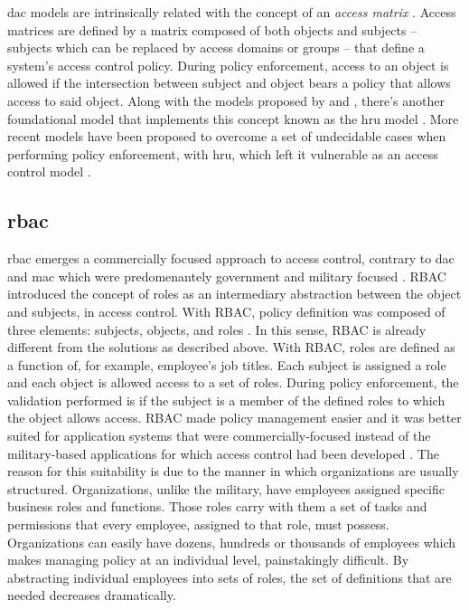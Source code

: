 \gls{dac} models are intrinsically related with the concept of an \emph{access matrix} \cite{graham_protection:_1972, lampson_protection_1974}. Access matrices are defined by a matrix composed of both objects and subjects – subjects which can
be replaced by access domains or groups – that define a system’s access control policy. During policy
enforcement, access to an object is allowed if the intersection between subject and object bears a policy
that allows access to said object. Along with the models proposed by \citeauthor{graham_protection:_1972} and \citeauthor{lampson_protection_1974}, there's another foundational model that implements this concept known as the \gls{hru} model \cite{harrison_protection_1976}. More recent models have been proposed to overcome a set of undecidable cases when performing policy enforcement, with \gls{hru}, which left it vulnerable as an access control model \cite{sandhu_schematic_1988, sandhu_typed_1992}.

\subsection{\glsdesc{rbac}}

\glsdesc{rbac} emerges a commercially focused approach to access control, contrary to \gls{dac} and \gls{mac} which were predomenantely government and military focused \cite{ferraiolo_role-based_1992}. RBAC introduced the concept of roles as an intermediary abstraction between the object and subjects, in access control. With RBAC, policy definition was composed of three elements: subjects, objects, and roles \cite{ferraiolo_role-based_1992}. In this sense, RBAC is already different from the solutions as described above. With RBAC, roles are defined as a function of, for example, employee’s job titles. Each subject is assigned a role and each object is allowed access to a set of roles. During policy enforcement, the validation performed is if the subject is a member of the defined roles to which the object allows access. RBAC made policy management easier and it was better suited for application systems that were commercially-focused instead of the military-based applications for which access control had been developed \cite{ferraiolo_role-based_1995}. The reason for this suitability is due to the manner in which organizations are usually structured. Organizations, unlike the military, have employees assigned specific business roles and functions. Those roles carry with them a set of tasks and permissions that every employee, assigned to that role, must possess. Organizations can easily have dozens, hundreds or thousands of employees which makes managing policy at an individual level, painstakingly difficult. By abstracting individual employees into sets of roles, the set of definitions that are needed decreases dramatically.

